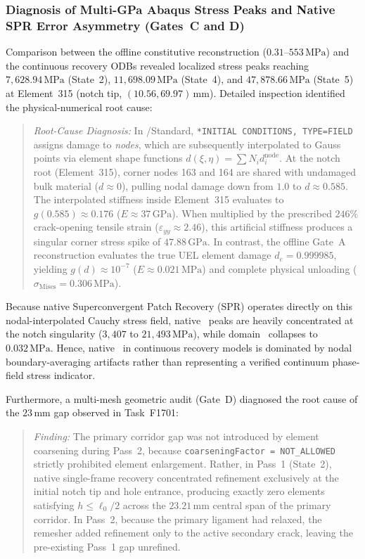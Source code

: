 \subsubsection{Diagnosis of Multi-GPa Abaqus Stress Peaks and Native SPR Error Asymmetry (Gates~C and D)}
Comparison between the offline constitutive reconstruction ($0.31$--$553\,\mathrm{MPa}$) and the \Abaqus continuous recovery ODBs revealed localized stress peaks reaching $7{,}628.94\,\mathrm{MPa}$ (State~2), $11{,}698.09\,\mathrm{MPa}$ (State~4), and $47{,}878.66\,\mathrm{MPa}$ (State~5) at Element~315 (notch tip, $(10.56, 69.97)\,\mathrm{mm}$). Detailed inspection identified the physical-numerical root cause:
\begin{quote}
\textit{Root-Cause Diagnosis:} In \Abaqus/Standard, \texttt{*INITIAL CONDITIONS, TYPE=FIELD} assigns damage to \textit{nodes}, which are subsequently interpolated to Gauss points via element shape functions $d(\xi, \eta) = \sum N_i d_i^{\mathrm{node}}$. At the notch root (Element~315), corner nodes 163 and 164 are shared with undamaged bulk material ($d \approx 0$), pulling nodal damage down from $1.0$ to $d \approx 0.585$. The interpolated stiffness inside Element~315 evaluates to $g(0.585) \approx 0.176$ ($E \approx 37\,\mathrm{GPa}$). When multiplied by the prescribed $246\%$ crack-opening tensile strain ($\varepsilon_{yy} \approx 2.46$), this artificial stiffness produces a singular corner stress spike of $47.88\,\mathrm{GPa}$. In contrast, the offline Gate~A reconstruction evaluates the true UEL element damage $d_e = 0.999985$, yielding $g(d) \approx 10^{-7}$ ($E \approx 0.021\,\mathrm{MPa}$) and complete physical unloading ($\sigma_{\mathrm{Mises}} = 0.306\,\mathrm{MPa}$).
\end{quote}
Because native \Abaqus Superconvergent Patch Recovery (SPR) operates directly on this nodal-interpolated Cauchy stress field, native \MISESERI\ peaks are heavily concentrated at the notch singularity ($3{,}407$ to $21{,}493\,\mathrm{MPa}$), while domain \MISESAVG\ collapses to $0.032\,\mathrm{MPa}$. Hence, native \MISESERI\ in continuous recovery models is dominated by nodal boundary-averaging artifacts rather than representing a verified continuum phase-field stress indicator.

Furthermore, a multi-mesh geometric audit (Gate~D) diagnosed the root cause of the $23\,\mathrm{mm}$ gap observed in Task~F1701:
\begin{quote}
\textit{Finding:} The primary corridor gap was not introduced by element coarsening during Pass~2, because \texttt{coarseningFactor = NOT\_ALLOWED} strictly prohibited element enlargement. Rather, in Pass~1 (State~2), native single-frame recovery concentrated refinement exclusively at the initial notch tip and hole entrance, producing exactly zero elements satisfying $h \le \ell_0/2$ across the $23.21\,\mathrm{mm}$ central span of the primary corridor. In Pass~2, because the primary ligament had relaxed, the remesher added refinement only to the active secondary crack, leaving the pre-existing Pass~1 gap unrefined.
\end{quote}

